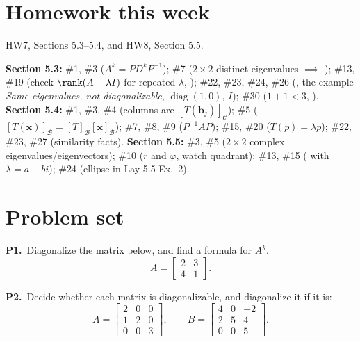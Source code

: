 \documentclass[10pt]{scrartcl}
\newcommand{\vv}[1]{\mathbf{#1}}
\begin{document}
\section{Homework this week}
HW7, Sections 5.3--5.4, and HW8, Section 5.5.
\begin{itemize}
  \ii \textbf{Section 5.3:} \#1, \#3 ($A^k=PD^kP^{-1}$); \#7 ($2\times 2$ distinct eigenvalues $\implies$ ); \#13, \#19 (check $\rank(A-\lambda I)$ for repeated $\lambda$, ); \#22, \#23, \#24, \#26 (, the example \emph{Same eigenvalues, not diagonalizable}, $\operatorname{diag}(1,0)$, $I$); \#30 ($1+1<3$, ).
  \ii \textbf{Section 5.4:} \#1, \#3, \#4 (columns are $[T(\vv b_j)]_{\mathcal C}$); \#5 ($[T(\vv x)]_{\mathcal B}=[T]_{\mathcal B}[\vv x]_{\mathcal B}$); \#7, \#8, \#9 ($P^{-1}AP$); \#15, \#20 ($T(p)=\lambda p$); \#22, \#23, \#27 (similarity facts).
  \ii \textbf{Section 5.5:} \#3, \#5 ($2\times 2$ complex eigenvalues/eigenvectors); \#10 ($r$ and $\varphi$, watch quadrant); \#13, \#15 ( with $\lambda=a-bi$); \#24 (ellipse in Lay 5.5 Ex.~2).
\end{itemize}

\section{Problem set}

\begin{prob}
  \textbf{P1.}\ Diagonalize the matrix below, and find a formula for $A^k$.
  \[
    A = \begin{bmatrix}2&3\\4&1\end{bmatrix}.
  \]
\end{prob}

\begin{prob}
  \textbf{P2.}\ Decide whether each matrix is diagonalizable, and diagonalize it if it is:
  \[
    A=\begin{bmatrix}2&0&0\\1&2&0\\0&0&3\end{bmatrix},\qquad
    B=\begin{bmatrix}4&0&-2\\2&5&4\\0&0&5\end{bmatrix}.
  \]
\end{prob}
\end{document}

